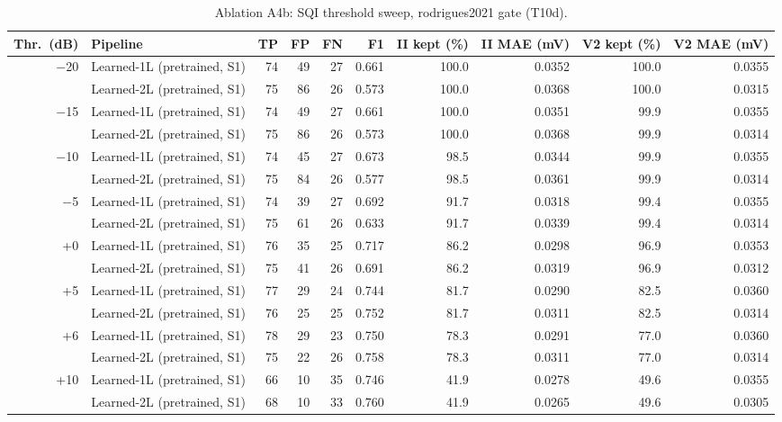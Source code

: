 \begin{table}[htbp]
\centering
\small
\caption{Ablation A4b: SQI threshold sweep, rodrigues2021 gate (T10d).}
\label{tab:t10_a4b}
\begin{tabular}{rlrrrrrrrr}
\toprule
Thr.\ (dB) & Pipeline & TP & FP & FN & F1 & II kept (\%) & II MAE (mV) & V2 kept (\%) & V2 MAE (mV) \\
\midrule
$-$20 & Learned-1L (pretrained, S1) & 74 & 49 & 27 & 0.661 & 100.0 & 0.0352 & 100.0 & 0.0355 \\
 & Learned-2L (pretrained, S1) & 75 & 86 & 26 & 0.573 & 100.0 & 0.0368 & 100.0 & 0.0315 \\
\midrule
$-$15 & Learned-1L (pretrained, S1) & 74 & 49 & 27 & 0.661 & 100.0 & 0.0351 & 99.9 & 0.0355 \\
 & Learned-2L (pretrained, S1) & 75 & 86 & 26 & 0.573 & 100.0 & 0.0368 & 99.9 & 0.0314 \\
\midrule
$-$10 & Learned-1L (pretrained, S1) & 74 & 45 & 27 & 0.673 & 98.5 & 0.0344 & 99.9 & 0.0355 \\
 & Learned-2L (pretrained, S1) & 75 & 84 & 26 & 0.577 & 98.5 & 0.0361 & 99.9 & 0.0314 \\
\midrule
$-$5 & Learned-1L (pretrained, S1) & 74 & 39 & 27 & 0.692 & 91.7 & 0.0318 & 99.4 & 0.0355 \\
 & Learned-2L (pretrained, S1) & 75 & 61 & 26 & 0.633 & 91.7 & 0.0339 & 99.4 & 0.0314 \\
\midrule
+0 & Learned-1L (pretrained, S1) & 76 & 35 & 25 & 0.717 & 86.2 & 0.0298 & 96.9 & 0.0353 \\
 & Learned-2L (pretrained, S1) & 75 & 41 & 26 & 0.691 & 86.2 & 0.0319 & 96.9 & 0.0312 \\
\midrule
+5 & Learned-1L (pretrained, S1) & 77 & 29 & 24 & 0.744 & 81.7 & 0.0290 & 82.5 & 0.0360 \\
 & Learned-2L (pretrained, S1) & 76 & 25 & 25 & 0.752 & 81.7 & 0.0311 & 82.5 & 0.0314 \\
\midrule
+6 & Learned-1L (pretrained, S1) & 78 & 29 & 23 & 0.750 & 78.3 & 0.0291 & 77.0 & 0.0360 \\
 & Learned-2L (pretrained, S1) & 75 & 22 & 26 & 0.758 & 78.3 & 0.0311 & 77.0 & 0.0314 \\
\midrule
+10 & Learned-1L (pretrained, S1) & 66 & 10 & 35 & 0.746 & 41.9 & 0.0278 & 49.6 & 0.0355 \\
 & Learned-2L (pretrained, S1) & 68 & 10 & 33 & 0.760 & 41.9 & 0.0265 & 49.6 & 0.0305 \\

\end{tabular}
\end{table}
